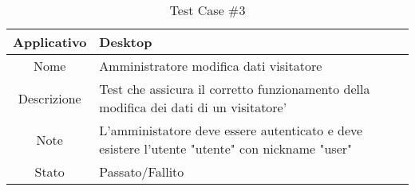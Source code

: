
\begin{table}[H]
    \centering
    \footnotesize
    \caption{Test Case \#3}
    \begin{tabularx}{\textwidth}{|c|X|}
        \hline
        Applicativo & Desktop\\
        \hline
        Nome & Amministratore modifica dati visitatore  \\
        \hline
        Descrizione & Test che assicura il corretto funzionamento della modifica dei dati di un visitatore'\\
        \hline
        Note & L'amministatore deve essere autenticato e deve esistere l'utente "utente" con nickname "user"  \\
        \hline
        Stato & Passato/Fallito\\
        \hline

    \end{tabularx}
    \setlength{\tabcolsep}{8pt}
    \renewcommand{\arraystretch}{1.5}
\end{table}
